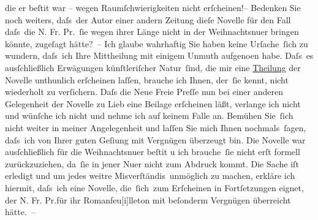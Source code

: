                die er beſti{\geminationm}t war – wegen Raumſchwierigkeiten nicht erſcheinen!– Bedenken Sie noch
               weiters, daſs der Autor einer andern Zeitung dieſe Novelle für den Fall daſs die N. Fr. Pr. ſie wegen ihrer Länge nicht in der
               Weihnachtsnu{\geminationm}er bringen könnte, zugeſagt hätte? – Ich glaube wahrhaftig Sie
               haben keine Urſache ſich zu wundern, daſs ich Ihre Mittheilung mit einigem Unmuth
               aufgeno{\geminationm}en habe. Daſs es {\pb}ausſchließlich Erwägungen
               künſtleriſcher Natur ſind, die mir eine \uline{Theilung} der
                  Novelle unthunlich
               erſcheinen laſſen, brauche ich Ihnen, der ſie kennt, nicht wiederholt zu verſichern.
               Daſs die Neue Freie Preſſe nun bei einer anderen
               Gelegenheit der Novelle zu
               Lieb eine Beilage erſcheinen läßt, verlange ich nicht und wünſche ich nicht und nehme
               ich auf keinem Falle an. Bemühen Sie ſich nicht weiter in meiner Angelegenheit und
               laſſen Sie mich {\pb}Ihnen nochmals ſagen, daſs ich von Ihrer
               guten Geſi{\geminationn}ung mit Vergnügen überzeugt bin. Die Novelle war ausſchließlich für die Weihnachtsnu{\geminationm}er
               beſti{\geminationm}t u ich brauche ſie nicht erſt formell zurückzuziehen, da ſie in jener Nu{\geminationm}er
               nicht zum Abdruck kommt. Die Sache iſt erledigt und um jedes weitre
               Misverſtändis unmöglich zu machen, erkläre ich hiermit, daſs ich eine Novelle,
               die ſich zum Erſcheinen in Fortſetzungen eignet, der N. Fr. Pr.für ihr Romanfeu{[}i{]}lleton mit beſonderm
               Vergnügen überreicht hätte. –\pend
           
